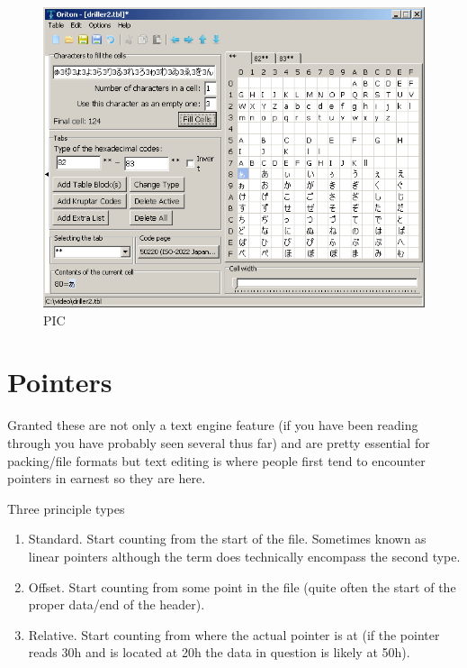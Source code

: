 \documentclass[
]{book}
\providecommand{\tightlist}{%
  \setlength{\itemsep}{0pt}\setlength{\parskip}{0pt}}
\begin{document}
\begin{figure}
\centering
\includegraphics{images/100_home_fast6191_romhackingguide_unrenamed_fil___ders_romhackingguidertexttablemakingOriton1.png}
\caption{PIC}
\end{figure}

\hypertarget{pointers}{%
\section{Pointers}\label{pointers}}

Granted these are not only a text engine feature (if you have been reading through you have probably seen several thus far) and are pretty essential for packing/file formats but text editing is where people first tend to encounter pointers in earnest so they are here.

Three principle types

\begin{enumerate}
\def\labelenumi{\arabic{enumi}.}
\tightlist
\item
  Standard. Start counting from the start of the file. Sometimes known as linear pointers although the term does technically encompass the second type.
\item
  Offset. Start counting from some point in the file (quite often the start of the proper data/end of the header).
\item
  Relative. Start counting from where the actual pointer is at (if the pointer reads 30h and is located at 20h the data in question is likely at 50h).
\end{enumerate}
\end{document}
